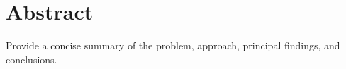 \section*{Abstract}

Provide a concise summary of the problem, approach, principal findings, and conclusions.
